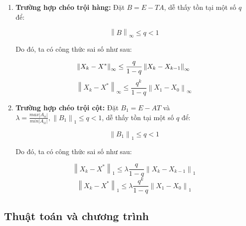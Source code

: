     \begin{enumerate}[label = (\roman*)]
        \item \textbf{Trường hợp chéo trội hàng:} Đặt $B = E - TA$, dễ thấy tồn tại một số $q$ để:
        
        $$ \left\lVert B\right\rVert _{\infty} \leq q < 1 $$ 
        
        Do đó, ta có công thức sai số như sau:
        
        \begin{equation}
            \left\lVert X_{k} - X^{*} \right\rVert_{\infty} \leq \frac{q}{1 - q} \left\lVert X_{k} - X_{k - 1} \right\rVert_{\infty} \\
        \end{equation}
        \begin{equation}
            \left\lVert X_{k} - X^{*} \right\rVert_{\infty} \leq \frac{q^{k}}{1 - q} \left\lVert X_{1} - X_{0} \right\rVert_{\infty}
        \end{equation}


        \item \textbf{Trường hợp chéo trội cột:} Đặt $B_{1} = E - AT$ và $\lambda = \frac{max \left\lvert A_{ii}\right\rvert }{min \left\lvert A_{ii}\right\rvert }, \left\lVert B_{1}\right\rVert _{1} \leq q < 1 $, dễ thấy tồn tại một số $q$ để:
        
        $$ \left\lVert B_{1} \right\rVert _{1} \leq q < 1 $$ 
        
        Do đó, ta có công thức sai số như sau:
        
        \begin{equation}
            \left\lVert X_{k} - X^{*} \right\rVert_{1} \leq \lambda \frac{q}{1 - q} \left\lVert X_{k} - X_{k - 1} \right\rVert_{1}
        \end{equation}
        \begin{equation}
            \left\lVert X_{k} - X^{*} \right\rVert_{1} \leq \lambda \frac{q^{k}}{1 - q} \left\lVert X_{1} - X_{0} \right\rVert_{1}
        \end{equation}

    \end{enumerate}

\subsection{Thuật toán và chương trình}

    

    \newpage




